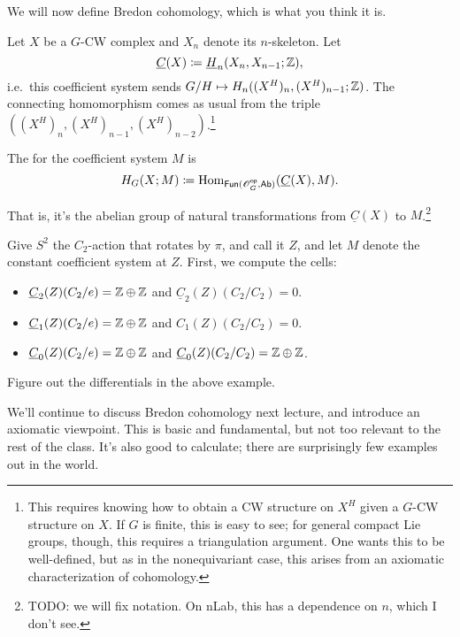 We will now define Bredon cohomology, which is what you think it is.
\begin{defn}
Let $X$ be a $G$-CW complex and $X_n$ denote its $n$-skeleton. Let
\[\underline C(X) \coloneqq \underline H_n(X_n, X_{n-1};\mathbb Z),\]
i.e.\ this coefficient system sends $G/H\mapsto H_n((X^H)_n, (X^H)_{n-1};\Z)$. The connecting
homomorphism comes as usual from the triple $((X^H)_n, (X^H)_{n-1}, (X^H)_{n-2})$.\footnote{This requires knowing
how to obtain a CW structure on $X^H$ given a $G$-CW structure on $X$. If $G$ is finite, this is easy to see; for
general compact Lie groups, though, this requires a triangulation argument. One wants this to be well-defined, but
as in the nonequivariant case, this arises from an axiomatic characterization of cohomology.}

The  for the coefficient system $M$ is
\[H_G(X;M) \coloneqq \operatorname{Hom}_{\mathsf{Fun}(\mathscr O_G^{\mathsf{op}}, \mathsf{Ab})}(\underline C(X), M).\]
\end{defn}
That is, it's the abelian group of natural transformations from $\underline C(X)$ to
$M$.\footnote{{\color{red}TODO}: we will fix notation. On nLab, this has a dependence on $n$, which I don't see.}
\begin{exm}
Give $S^2$ the $C_2$-action that rotates by $\pi$, and call it $Z$, and let $M$ denote the constant coefficient
system at $Z$. First, we compute the cells:
\begin{itemize}
	\item $\underline C_2(Z)(C_2/e) = \mathbb Z\oplus\mathbb Z$ and $\underline C_2(Z)(C_2/C_2) = 0$.
	\item $\underline C_1(Z)(C_2/e) = \mathbb Z\oplus\mathbb Z$ and $C_1(Z)(C_2/C_2) = 0$.
	\item $\underline C_0(Z)(C_2/e) = \mathbb Z\oplus\mathbb Z$ and $\underline C_0(Z)(C_2/C_2) = \mathbb Z\oplus\mathbb Z$.\qedhere
\end{itemize}
\end{exm}
\begin{ex}
Figure out the differentials in the above example.
\end{ex}
We'll continue to discuss Bredon cohomology next lecture, and introduce an axiomatic viewpoint. This is basic and
fundamental, but not too relevant to the rest of the class. It's also good to calculate; there are surprisingly few
examples out in the world.
